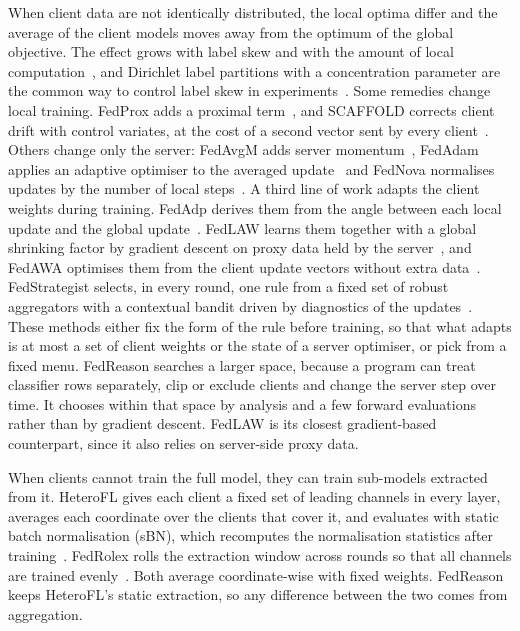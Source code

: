 \documentclass[3p,times,a4paper]{elsarticle}
\begin{document}
When client data are not identically distributed, the local optima differ and the average of the client models moves away from the optimum of the global objective. The effect grows with label skew and with the amount of local computation~\cite{hsu2019measuring,li2022niid}, and Dirichlet label partitions with a concentration parameter are the common way to control label skew in experiments~\cite{hsu2019measuring,li2022niid}. Some remedies change local training. FedProx adds a proximal term~\cite{li2020fedprox}, and SCAFFOLD corrects client drift with control variates, at the cost of a second vector sent by every client~\cite{karimireddy2020scaffold}. Others change only the server: FedAvgM adds server momentum~\cite{hsu2019measuring}, FedAdam applies an adaptive optimiser to the averaged update~\cite{reddi2021adaptive} and FedNova normalises updates by the number of local steps~\cite{wang2020tackling}. A third line of work adapts the client weights during training. FedAdp derives them from the angle between each local update and the global update~\cite{wu2021fedadp}. FedLAW learns them together with a global shrinking factor by gradient descent on proxy data held by the server~\cite{li2023fedlaw}, and FedAWA optimises them from the client update vectors without extra data~\cite{shi2025fedawa}. FedStrategist selects, in every round, one rule from a fixed set of robust aggregators with a contextual bandit driven by diagnostics of the updates~\cite{haque2025fedstrategist}. These methods either fix the form of the rule before training, so that what adapts is at most a set of client weights or the state of a server optimiser, or pick from a fixed menu. FedReason searches a larger space, because a program can treat classifier rows separately, clip or exclude clients and change the server step over time. It chooses within that space by analysis and a few forward evaluations rather than by gradient descent. FedLAW is its closest gradient-based counterpart, since it also relies on server-side proxy data.

When clients cannot train the full model, they can train sub-models extracted from it. HeteroFL gives each client a fixed set of leading channels in every layer, averages each coordinate over the clients that cover it, and evaluates with static batch normalisation (sBN), which recomputes the normalisation statistics after training~\cite{diao2021heterofl}. FedRolex rolls the extraction window across rounds so that all channels are trained evenly~\cite{alam2022fedrolex}. Both average coordinate-wise with fixed weights. FedReason keeps HeteroFL's static extraction, so any difference between the two comes from aggregation.
\end{document}
